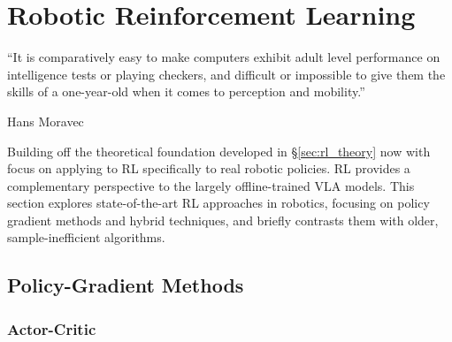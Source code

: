\chapter{Robotic Reinforcement Learning}
\label{sec:rrl}

\epigraph{``It is comparatively easy to make computers exhibit adult level performance on intelligence tests or playing checkers, and difficult or impossible to give them the skills of a one-year-old when it comes to perception and mobility.''}{Hans Moravec \cite{MORAVEC1988}}


Building off the theoretical foundation developed in \S\ref{sec:rl_theory} now with focus on applying to \ac{RL} specifically to real robotic policies. \ac{RL} provides a complementary perspective to the largely offline-trained \ac{VLA} models. This section explores state-of-the-art \ac{RL} approaches in robotics, focusing on policy gradient methods and hybrid techniques, and briefly contrasts them with older, sample-inefficient algorithms.

\section{Policy-Gradient Methods}

\subsection{Actor-Critic}




